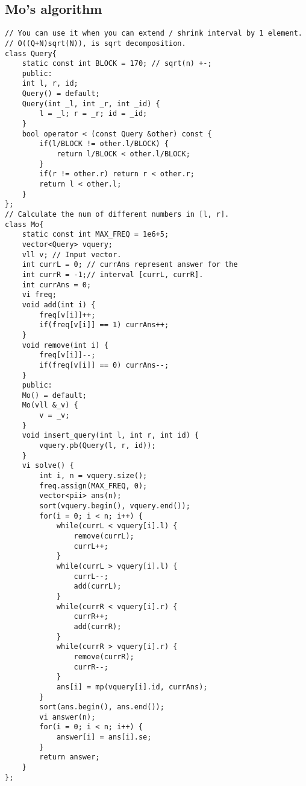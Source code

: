 \documentclass[a4paper]{article}
\begin{document}
\subsection*{Mo's algorithm}
\begin{verbatim}
// You can use it when you can extend / shrink interval by 1 element.
// O((Q+N)sqrt(N)), is sqrt decomposition.
class Query{
    static const int BLOCK = 170; // sqrt(n) +-;
    public:
    int l, r, id;
    Query() = default;
    Query(int _l, int _r, int _id) {
        l = _l; r = _r; id = _id;
    }
    bool operator < (const Query &other) const {
        if(l/BLOCK != other.l/BLOCK) {
            return l/BLOCK < other.l/BLOCK;
        }
        if(r != other.r) return r < other.r;
        return l < other.l;
    }
};
// Calculate the num of different numbers in [l, r].
class Mo{
    static const int MAX_FREQ = 1e6+5;
    vector<Query> vquery;
    vll v; // Input vector.
    int currL = 0; // currAns represent answer for the
    int currR = -1;// interval [currL, currR].
    int currAns = 0;
    vi freq;
    void add(int i) {
        freq[v[i]]++;
        if(freq[v[i]] == 1) currAns++; 
    }
    void remove(int i) {
        freq[v[i]]--;
        if(freq[v[i]] == 0) currAns--;
    }
    public:
    Mo() = default;
    Mo(vll &_v) {
        v = _v;
    }
    void insert_query(int l, int r, int id) {
        vquery.pb(Query(l, r, id));
    }
    vi solve() {
        int i, n = vquery.size();
        freq.assign(MAX_FREQ, 0);
        vector<pii> ans(n);
        sort(vquery.begin(), vquery.end());
        for(i = 0; i < n; i++) {
            while(currL < vquery[i].l) {
                remove(currL);
                currL++;
            }
            while(currL > vquery[i].l) {
                currL--;
                add(currL);
            }
            while(currR < vquery[i].r) {
                currR++;
                add(currR);
            }
            while(currR > vquery[i].r) {
                remove(currR);
                currR--;
            }
            ans[i] = mp(vquery[i].id, currAns);
        }
        sort(ans.begin(), ans.end());
        vi answer(n);
        for(i = 0; i < n; i++) {
            answer[i] = ans[i].se;
        }
        return answer;
    }
};
\end{verbatim}
\begin{verbatim}
\end{verbatim}
\begin{verbatim}
\end{verbatim}
\begin{verbatim}
\end{verbatim}
\begin{verbatim}
\end{verbatim}
\end{document}
